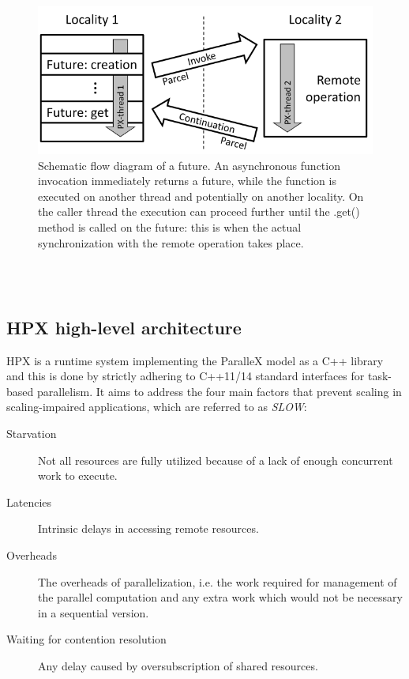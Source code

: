 \begin{figure}[t]
 	\begin{center}
 		\includegraphics[scale=0.35]{Figures/futureFlowDiagram.png}
 		\caption{Schematic flow diagram of a future\protect\cite{kaiser2009parallex}.
 		An asynchronous function invocation immediately returns a future, while the function is executed on another thread and potentially on another locality. On the caller thread the execution can proceed further until the .get() method is called on the future: this is when the actual synchronization with the remote operation takes place.}
 		\label{fig:futureFlowDiagram}
 	\end{center}
\end{figure}
~\\~

\subsection{HPX high-level architecture}
HPX is a runtime system implementing the ParalleX model as a C++ library and this is done by strictly adhering to C++11/14 standard interfaces for task-based parallelism.
It aims to address the four main factors that prevent scaling in scaling-impaired applications, which are referred to as \emph{SLOW}\cite{kaiser2014hpx}:
\begin{description}
	\item [Starvation] Not all resources are fully utilized because of a lack of enough concurrent work to execute.
	\item [Latencies] Intrinsic delays in accessing remote resources.
	\item [Overheads] The overheads of parallelization, i.e. the work required for management of the parallel computation and any extra work which would not be necessary in a sequential version.
	\item [Waiting for contention resolution] Any delay caused by oversubscription of shared resources.
\end{description}

